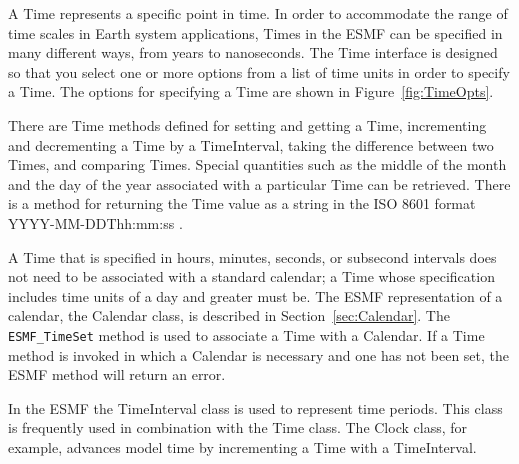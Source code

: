 \label{sec:Time}

A Time represents a specific point in time.  In order to accommodate
the range of time scales in Earth system applications, Times in
the ESMF can be specified in many different ways, from years to 
nanoseconds.  The Time interface is designed so that you select one or 
more options from a list of time units in order to specify a 
Time. The options for specifying a Time are shown in 
Figure~\ref{fig:TimeOpts}.  

There are Time methods defined for setting and getting a
Time, incrementing and decrementing a Time by a TimeInterval,
taking the difference between two Times, and comparing Times.
Special quantities such as the middle of the month and the 
day of the year associated with a particular Time can be retrieved. 
There is a method for returning the Time value as a string in 
the ISO 8601 format YYYY-MM-DDThh:mm:ss \cite{ISO}.

A Time that is specified in hours, minutes, seconds, or subsecond intervals 
does not need to be associated with a standard calendar; a Time whose
specification includes time units of a day and greater must be.  The 
ESMF representation
of a calendar, the Calendar class, is described in Section~\ref{sec:Calendar}.
The {\tt ESMF\_TimeSet} method is used to associate a Time with a 
Calendar.  If a Time method is invoked in which a Calendar is 
necessary and one has not been set, the ESMF method will return an error.

In the ESMF the TimeInterval class is used to represent time periods.
This class is frequently used in combination with the Time class.
The Clock class, for example, advances model time by incrementing a
Time with a TimeInterval. 
 




